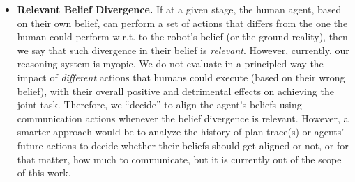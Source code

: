 \documentclass[letterpaper]{article} %
\begin{document}

\begin{itemize}
    \item \textbf{Relevant Belief Divergence.} 
    If at a given stage, the human agent, based on their own belief, can perform a set of actions that differs from 
    the one 
    the human could perform w.r.t. to the robot's belief (or the ground reality), then we say that such divergence in their belief is \textit{relevant}.
    However, currently, our reasoning system is myopic. We do not evaluate in a principled way the impact of \textit{different} actions that humans could execute (based on their wrong belief), with their overall positive and detrimental effects on achieving the joint task. Therefore, we ``decide'' to align the agent's beliefs using communication actions whenever the belief divergence is relevant.
    However, a smarter approach would be to analyze the history of plan trace(s) or agents' future actions to decide whether their beliefs should get aligned or not, or for that matter, how much to communicate, but it is currently out of the scope of this work. 
    

\end{itemize}
\end{document}
